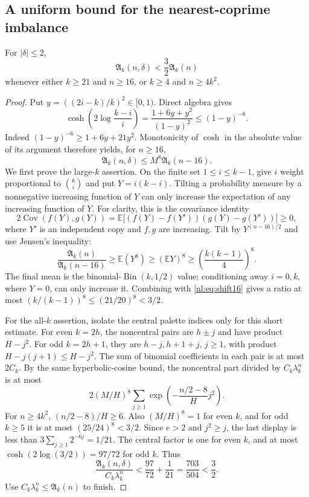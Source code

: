 \documentclass[11pt,a4paper]{article}
\numberwithin{equation}{section}
\theoremstyle{definition}
\theoremstyle{remark}
\newcommand{\nlenv}{\mathfrak A}
\begin{document}
\subsection{A uniform bound for the nearest-coprime imbalance}
\begin{lemma}\label{nl:lem:imbalance}
For $|\delta|\le2$,
\begin{equation}\label{nl:eq:imbalance}
 \nlenv_k(n,\delta)<\frac32\nlenv_k(n)
\end{equation}
whenever either $k\ge21$ and $n\ge16$, or $k\ge4$ and $n\ge4k^2$.
\end{lemma}
\begin{proof}
Put $y=((2i-k)/k)^2\in[0,1)$. Direct algebra gives
\[
 \cosh\!\left(2\log\frac{k-i}{i}\right)
 =\frac{1+6y+y^2}{(1-y)^2}\le(1-y)^{-8}.
\]
Indeed $(1-y)^{-6}\ge1+6y+21y^2$. Monotonicity of $\cosh$ in the
absolute value of its argument therefore yields, for $n\ge16$,
\begin{equation}\label{nl:eq:shift16}
 \nlenv_k(n,\delta)\le M^8\nlenv_k(n-16).
\end{equation}
We first prove the large-$k$ assertion. On the finite set $1\le i\le k-1$,
give $i$ weight proportional to $\binom ki$ and put $Y=i(k-i)$.
Tilting a probability measure by a nonnegative increasing function of $Y$
can only increase the expectation of any increasing function of $Y$.
For clarity, this is the covariance identity
\[
 2\operatorname{Cov}(f(Y),g(Y))
 =\mathbb E\bigl[(f(Y)-f(Y'))(g(Y)-g(Y'))\bigr]\ge0,
\]
where $Y'$ is an independent copy and $f,g$ are increasing.
Tilt by $Y^{(n-16)/2}$ and use Jensen's inequality:
\[
 \frac{\nlenv_k(n)}{\nlenv_k(n-16)}
 \ge \mathbb E(Y^8)\ge (\mathbb E Y)^8
 \ge\left(\frac{k(k-1)}4\right)^8.
\]
The final mean is the binomial-$\operatorname{Bin}(k,1/2)$ value;
conditioning away $i=0,k$, where $Y=0$, can only increase it. Combining
with \eqref{nl:eq:shift16} gives a ratio at most
$(k/(k-1))^8\le(21/20)^8<3/2$.

For the all-$k$ assertion, isolate the central palette indices only for
this short estimate. For even $k=2h$, the noncentral pairs are $h\pm j$
and have product $H-j^2$. For odd $k=2h+1$, they are $h-j,h+1+j$,
$j\ge1$, with product $H-j(j+1)\le H-j^2$.
The sum of binomial coefficients in each pair is at most $2C_k$.
By the same hyperbolic-cosine bound, the noncentral part divided by
$C_k\lambda_k^n$ is at most
\[
 2(M/H)^8\sum_{j\ge1}
 \exp\left(-\frac{n/2-8}{H}j^2\right).
\]
For $n\ge4k^2$, $(n/2-8)/H\ge6$. Also $(M/H)^8=1$ for even $k$,
and for odd $k\ge5$ it is at most $(25/24)^8<3/2$.
Since $e>2$ and $j^2\ge j$, the last display is less than
$3\sum_{j\ge1}2^{-6j}=1/21$.
The central factor is one for even $k$, and at most
$\cosh(2\log(3/2))=97/72$ for odd $k$.
Thus
\[
 \frac{\nlenv_k(n,\delta)}{C_k\lambda_k^n}
 <\frac{97}{72}+\frac1{21}=\frac{703}{504}<\frac32.
\]
Use $C_k\lambda_k^n\le\nlenv_k(n)$ to finish.
\end{proof}
\end{document}
